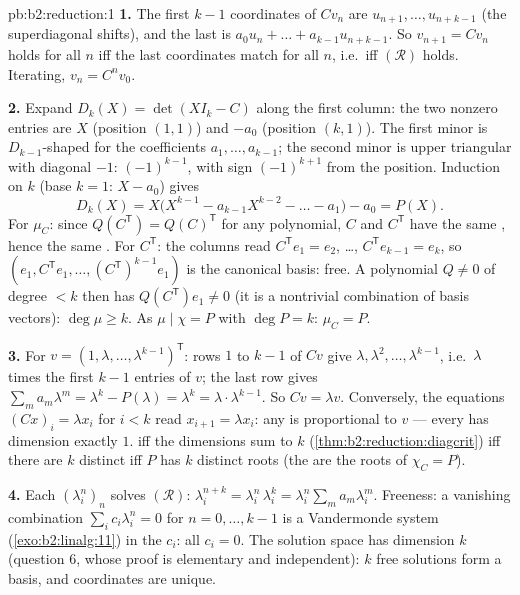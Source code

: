 \begin{solution}{pb:b2:reduction:1}
\textbf{1.} The first $k - 1$ coordinates of $Cv_n$ are $u_{n+1},
\dots, u_{n+k-1}$ (the superdiagonal shifts), and the last is
$a_0 u_n + \dots + a_{k-1}u_{n+k-1}$. So $v_{n+1} = Cv_n$ holds
for all $n$ iff the last coordinates match for all $n$, i.e.\ iff
$(\mathcal R)$ holds. Iterating, $v_n = C^nv_0$.

\textbf{2.} Expand $D_k(X) = \det(XI_k - C)$ along the first
column: the two nonzero entries are $X$ (position $(1,1)$) and
$-a_0$ (position $(k,1)$). The first minor is $D_{k-1}$-shaped
for the coefficients $a_1, \dots, a_{k-1}$; the second minor is
upper triangular with diagonal $-1$:  $(-1)^{k-1}$,
with sign $(-1)^{k+1}$ from the position. Induction on $k$
(base $k = 1$: $X - a_0$) gives
\[
D_k(X) = X\bigl(X^{k-1} - a_{k-1}X^{k-2} - \dots - a_1\bigr) -
a_0 = P(X).
\]
For $\mu_C$: since $Q(C^{\mathsf T}) = Q(C)^{\mathsf T}$ for any
polynomial, $C$ and $C^{\mathsf T}$ have the same ,
hence the same . For $C^{\mathsf T}$: the
columns read $C^{\mathsf T}e_1 = e_2$, \dots, $C^{\mathsf
T}e_{k-1} = e_k$, so $(e_1, C^{\mathsf T}e_1, \dots, (C^{\mathsf
T})^{k-1}e_1)$ is the canonical basis: free. A polynomial $Q
\neq 0$ of degree $< k$ then has $Q(C^{\mathsf T})e_1 \neq 0$
(it is a nontrivial combination of basis vectors): $\deg\mu \geq
k$. As $\mu \mid \chi = P$ with $\deg P = k$: $\mu_C = P$.

\textbf{3.} For $v = (1, \lambda, \dots, \lambda^{k-1})^{\mathsf
T}$: rows $1$ to $k-1$ of $Cv$ give $\lambda, \lambda^2, \dots,
\lambda^{k-1}$, i.e.\ $\lambda$ times the first $k - 1$ entries
of $v$; the last row gives $\sum_m a_m\lambda^m = \lambda^k -
P(\lambda) = \lambda^k = \lambda\cdot\lambda^{k-1}$. So $Cv =
\lambda v$. Conversely, the equations $(Cx)_i = \lambda x_i$ for
$i < k$ read $x_{i+1} = \lambda x_i$: any  is
proportional to $v$ --- every  has dimension exactly
$1$.  iff the  dimensions sum to $k$
(\cref{thm:b2:reduction:diagcrit}) iff there are $k$ distinct
 iff $P$ has $k$ distinct roots (the  are
the roots of $\chi_C = P$).

\textbf{4.} Each $(\lambda_i^n)_n$ solves $(\mathcal R)$:
$\lambda_i^{n+k} = \lambda_i^n\,\lambda_i^k =
\lambda_i^n\sum_m a_m\lambda_i^m$. Freeness: a vanishing
combination $\sum_i c_i\lambda_i^n = 0$ for $n = 0, \dots, k-1$
is a Vandermonde system (\cref{exo:b2:linalg:11}) in the $c_i$:
all $c_i = 0$. The solution space has dimension $k$ (question 6,
whose proof is elementary and independent): $k$ free solutions
form a basis, and coordinates are unique.


\end{solution}
